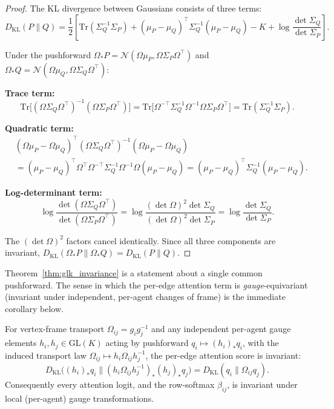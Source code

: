 \documentclass[twoside,11pt]{article}
\begin{document}
\begin{proof}
The KL divergence between Gaussians consists of three terms:
\begin{equation}
D_{\mathrm{KL}}(P \| Q) = \frac{1}{2}\left[\mathrm{Tr}(\Sigma_Q^{-1}\Sigma_P) + (\mu_P - \mu_Q)^\top \Sigma_Q^{-1}(\mu_P - \mu_Q) - K + \log\frac{\det\Sigma_Q}{\det\Sigma_P}\right].
\end{equation}

Under the pushforward $\Omega_* P = \mathcal{N}(\Omega\mu_P, \Omega\Sigma_P\Omega^\top)$ and $\Omega_* Q = \mathcal{N}(\Omega\mu_Q, \Omega\Sigma_Q\Omega^\top)$:

\textbf{Trace term:}
\begin{equation}
\mathrm{Tr}\big[(\Omega\Sigma_Q\Omega^\top)^{-1}(\Omega\Sigma_P\Omega^\top)\big] = \mathrm{Tr}\big[\Omega^{-\top}\Sigma_Q^{-1}\Omega^{-1}\Omega\Sigma_P\Omega^\top\big] = \mathrm{Tr}(\Sigma_Q^{-1}\Sigma_P). 
\end{equation}

\textbf{Quadratic term:}
\begin{align}
&(\Omega\mu_P - \Omega\mu_Q)^\top (\Omega\Sigma_Q\Omega^\top)^{-1} (\Omega\mu_P - \Omega\mu_Q) \nonumber\\
&= (\mu_P - \mu_Q)^\top \Omega^\top \Omega^{-\top}\Sigma_Q^{-1}\Omega^{-1}\Omega (\mu_P - \mu_Q) = (\mu_P - \mu_Q)^\top \Sigma_Q^{-1}(\mu_P - \mu_Q). 
\end{align}

\textbf{Log-determinant term:}
\begin{equation}
\log\frac{\det(\Omega\Sigma_Q\Omega^\top)}{\det(\Omega\Sigma_P\Omega^\top)} = \log\frac{(\det\Omega)^2 \det\Sigma_Q}{(\det\Omega)^2 \det\Sigma_P} = \log\frac{\det\Sigma_Q}{\det\Sigma_P}. 
\end{equation}

The $(\det\Omega)^2$ factors cancel identically. Since all three components are invariant, $D_{\mathrm{KL}}(\Omega_* P \| \Omega_* Q) = D_{\mathrm{KL}}(P \| Q)$.
\end{proof}

Theorem~\ref{thm:glk_invariance} is a statement about a single common pushforward. The sense in which the per-edge attention term is \emph{gauge}-equivariant (invariant under independent, per-agent changes of frame) is the immediate corollary below.

\begin{corollary}
\label{cor:local_gauge_invariance}
For vertex-frame transport $\Omega_{ij} = g_i g_j^{-1}$ and any independent per-agent gauge elements $h_i, h_j \in \mathrm{GL}(K)$ acting by pushforward $q_i \mapsto (h_i)_* q_i$, with the induced transport law $\Omega_{ij} \mapsto h_i \Omega_{ij} h_j^{-1}$, the per-edge attention score is invariant:
\begin{equation}
D_{\mathrm{KL}}\big((h_i)_* q_i \big\| (h_i \Omega_{ij} h_j^{-1})_* (h_j)_* q_j\big) = D_{\mathrm{KL}}(q_i \| \Omega_{ij} q_j).
\label{eq:local_gauge_invariance}
\end{equation}
Consequently every attention logit, and the row-softmax $\beta_{ij}$, is invariant under local (per-agent) gauge transformations.
\end{corollary}
\end{document}
